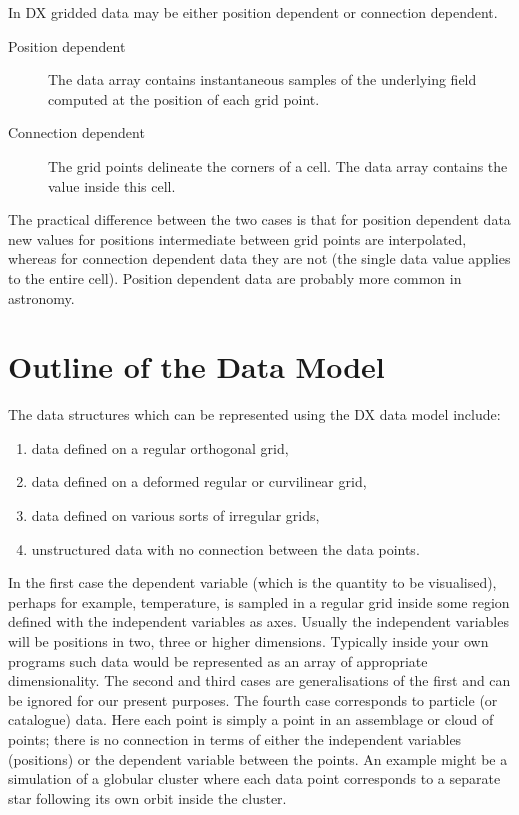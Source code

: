\documentclass[twoside,11pt]{starlink}
\begin{document}
In DX gridded data may be either position dependent or connection
dependent.

\begin{description}

  \item[Position dependent] The data array contains instantaneous
   samples of the underlying field computed at the position of each
   grid point.

  \item[Connection dependent] The grid points delineate the corners
   of a cell. The data array contains the value inside this cell.

\end{description}

The practical difference between the two cases is that for position
dependent data new values for positions intermediate between grid points
are interpolated, whereas for connection dependent data they are not
(the single data value applies to the entire cell). Position dependent
data are probably more common in astronomy.


\section{\label{OUTLINE}Outline of the Data Model}


The data structures which can be represented using the DX data model
include:

\begin{enumerate}

  \item data defined on a regular orthogonal grid,

  \item data defined on a deformed regular or curvilinear grid,

  \item data defined on various sorts of irregular grids,

  \item unstructured data with no connection between the data points.

\end{enumerate}

In the first case the dependent variable (which is the quantity to be
visualised), perhaps for example, temperature, is sampled in a regular
grid inside some region defined with the independent variables as axes.
Usually the independent variables will be positions in two, three or
higher dimensions. Typically inside your own programs such data would be
represented as an array of appropriate dimensionality. The second and third
cases are generalisations of the first and can be ignored for our present
purposes. The fourth case corresponds to particle (or catalogue) data.
Here each point is simply a point in an assemblage or cloud of points;
there is no connection in terms of either the independent variables
(positions) or the dependent variable between the points. An example
might be a simulation of a globular cluster where each data point
corresponds to a separate star following its own orbit inside the
cluster.
\end{document}
